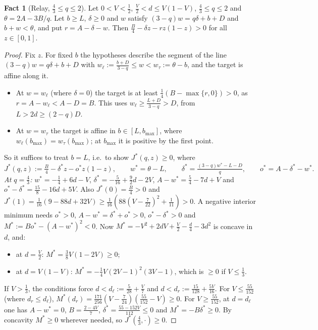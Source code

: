 \documentclass[11pt,a4paper]{article}
\numberwithin{equation}{section}
\theoremstyle{definition}
\newtheorem{fact}{Fact}
\begin{document}
\begin{fact}[Relay, $\frac43\le q\le2$]\label{fact:fourthirds}Let $0<V<\frac12$, $\frac V2<d\le V(1-V)$, $\frac43\le q\le2$ and
$\theta=2A-3B/q$. Let $b\ge L$, $\delta\ge0$ and $w$ satisfy
$(3-q)w=q\delta+b+D$ and $b+w<\theta$, and put $r=A-\delta-w$. Then
$\frac B4-\delta z-rz(1-z)>0$ for all $z\in[0,1]$.
\end{fact}
\begin{proof}
Fix $z$. For fixed $b$ the hypotheses describe the segment of the line
$(3-q)w=q\delta+b+D$ with $w_\ell:=\frac{b+D}{3-q}\le w<w_\tau:=\theta-b$, and
the target is affine along it.
\begin{itemize}
\item At $w=w_\ell$ (where $\delta=0$) the target is at least
$\frac14(B-\max\{r,0\})>0$, as $r=A-w_\ell<A-D=B$. This uses
$w_\ell\ge\frac{L+D}{3-q}>D$, from $L>2d\ge(2-q)D$.
\item At $w=w_\tau$ the target is affine in $b\in[L,b_{\max}]$, where
$w_\ell(b_{\max})=w_\tau(b_{\max})$; at $b_{\max}$ it is positive by the first
point.
\end{itemize}
So it suffices to treat $b=L$, i.e.\ to show $J^*(q,z)\ge0$, where
\[
J^*(q,z):=\tfrac B4-\delta^*z-o^*z(1-z),\qquad w^*=\theta-L,\qquad
\delta^*=\tfrac{(3-q)w^*-L-D}q,\qquad o^*=A-\delta^*-w^*.
\]
\emph{At $q=\frac43$:} $w^*=-\frac14+6d-V$, $\delta^*=-\frac5{16}+\frac92d-2V$,
$A-w^*=\frac54-7d+V$ and $o^*-\delta^*=\frac{15}8-16d+5V$. Also
$J^*(0)=\frac B4>0$ and
$J^*(1)=\frac1{16}(9-88d+32V)\ge\frac1{16}(88(V-\frac7{22})^2+\frac1{11})>0$.
A negative interior minimum needs $o^*>0$, $A-w^*=\delta^*+o^*>0$,
$o^*-\delta^*>0$ and $M^*:=Bo^*-(A-w^*)^2<0$. Now
$M^*=-V^2+2dV+\frac V2-\frac d4-3d^2$ is concave in $d$, and:
\begin{itemize}
\item at $d=\frac V2$: $M^*=\frac38V(1-2V)\ge0$;
\item at $d=V(1-V)$: $M^*=-\frac14V(2V-1)^2(3V-1)$, which is $\ge0$ if
$V\le\frac13$.
\end{itemize}
If $V>\frac13$, the conditions force $d<d_\ell:=\frac5{28}+\frac V7$ and
$d<d_r:=\frac{15}{128}+\frac{5V}{16}$. For $V\le\frac{55}{152}$ (where
$d_r\le d_\ell$), $M^*(d_r)=\frac{171}{256}(V-\frac7{24})(\frac{55}{152}-V)\ge0$.
For $V\ge\frac{55}{152}$, at $d=d_\ell$ one has $A-w^*=0$, $B=\frac{2-4V}7$,
$\delta^*=\frac{55-152V}{112}\le0$ and $M^*=-B\delta^*\ge0$. By concavity
$M^*\ge0$ wherever needed, so $J^*(\frac43,\cdot)\ge0$.


\end{proof}
\end{document}
